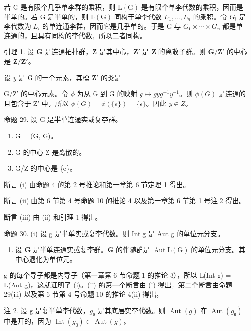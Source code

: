 若 G 是有限个几乎单李群的乘积，则 \(\mathrm{L}(\mathrm{G})\) 是有限个单李代数的乘积，因而是半单的。若 G 是半单的，则 \(\mathrm{L}(\mathrm{G})\) 同构于单李代数 \(L_{1},\ldots,L_{n}\) 的乘积。令 \(G_{i}\) 是李代数为 \(L_{i}\) 的单连通李群，因而它是几乎单的。于是 G 与 \(G_{1}\times\cdots\times G_{n}\) 都是单连通的，且具有同构的李代数，所以二者同构。

引理 1. 设 \(\mathbf{G}\) 是连通拓扑群，\(\mathbf{Z}\) 是其中心，\(\mathbf{Z}'\) 是 \(\mathbf{Z}\) 的离散子群。则 \(\mathbf{G}/\mathbf{Z}'\) 的中心是 \(\mathbf{Z}/\mathbf{Z}'\)。

设 \(y\) 是 G 的一个元素，其模 \(\mathbf{Z}'\) 的类是

G/Z' 的中心元素。令 \(\phi\) 为从 G 到 G 的映射 \(g \mapsto gyg^{-1}y^{-1}\)。则 \(\phi(G)\) 是连通的且包含于 Z' 中，所以 \(\phi(G) = \phi(\{e\}) = \{e\}\)。因此 \(y \in Z\)。

命题 29. 设 G 是半单连通实或复李群。

\begin{enumerate}
\def\labelenumi{(\roman{enumi})}
\item
  G = (G, G)。
\item
  G 的中心 Z 是离散的。
\item
  G/Z 的中心是 \{e\}。
\end{enumerate}

断言 (i) 由命题 4 的第 2 号推论和第一章第 6 节定理 1 得出。

断言 (ii) 由第 6 节第 4 号命题 10 的推论 4 以及第一章第 6 节第 1 号注 2 得出。

断言 (iii) 由 (ii) 和引理 1 得出。

命题 30. (i) 设 g 是半单实或复李代数。则 Int g 是 Aut g 的单位元分支。

\begin{enumerate}
\def\labelenumi{(\roman{enumi})}
\setcounter{enumi}{1}
\tightlist
\item
  设 \(\mathbf{G}\) 是半单连通实或复李群。\(\mathbf{G}\) 的伴随群是 \(\operatorname{Aut} \mathrm{L}(\mathrm{G})\) 的单位元分支。其中心退化为单位元。
\end{enumerate}

g 的每个导子都是内导子（第一章第 6 节命题 1 的推论 3），所以 L(Int g) = L(Aut g)，这就证明了 (i)。(ii) 的第一个断言由 (i) 得出，第二个断言由命题 29(iii) 以及第 6 节第 4 号命题 10 的推论 4(ii) 得出。

注 2. 设 g 是复半单李代数，\(g_{0}\) 是其底层实李代数。则 \(\operatorname{Aut}(g)\) 在 \(\operatorname{Aut}(g_{0})\) 中是开的，因为 \(\operatorname{Int}(g_{0}) \subset \operatorname{Aut}(g)\)。


